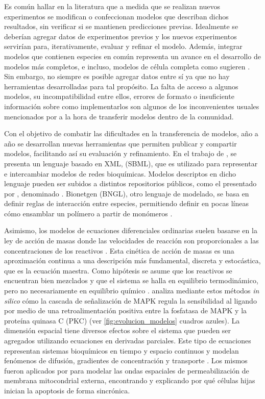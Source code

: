 Es común hallar en la literatura que a medida que se realizan nuevos experimentos se modifican o confeccionan modelos que describan dichos resultados, sin verificar si se mantienen predicciones previas. Idealmente se deberían agregar datos de experimentos previos y los nuevos experimentos servirían para, iterativamente, evaluar y refinar el modelo. Además, integrar modelos que contienen especies en común representa un avance en el desarrollo de modelos más completos, e incluso, modelos de célula completa como sugieren \cite{Karr2015}. Sin embargo, no siempre es posible agregar datos entre sí ya que no hay herramientas desarrolladas para tal propósito. La falta de acceso a algunos modelos, su incompatibilidad entre ellos, errores de formato o insuficiente información sobre como implementarlos son algunos de los inconvenientes usuales mencionados por \cite{Szigeti2018} a la hora de transferir modelos dentro de la comunidad.

Con el objetivo de combatir las dificultades en la transferencia de modelos, año a año se desarrollan nuevas herramientas que permiten publicar y compartir modelos, facilitando así su evaluación y refinamiento. En el trabajo de \cite{Hucka2003}, se presenta un lenguaje basado en XML,  (SBML), que es utilizado para representar e intercambiar modelos de redes bioquímicas. Modelos descriptos en dicho lenguaje pueden ser subidos a distintos repositorios públicos, como el presentado por \cite{Malik-Sheriff2018}, denominado . Bionetgen (BNGL), otro lenguaje de modelado, se basa en definir reglas de interacción entre especies, permitiendo definir en pocas líneas cómo ensamblar un polímero a partir de monómeros \citep{Harris2016}.

Asimismo, los modelos de ecuaciones diferenciales ordinarias suelen basarse en la ley de acción de masas donde las velocidades de reacción son proporcionales a las concentraciones de los reactivos \citep{Sorger2011}. Esta cinética de acción de masas es una aproximación continua a una descripción más fundamental, discreta y estocástica, que es la ecuación maestra. Como hipótesis se asume que los reactivos se encuentran bien mezclados y que el sistema se halla en equilibrio termodinámico, pero no necesariamente en equilibrio químico \citep{Chen2010}. \cite{Bhalla2002} analiza mediante estos métodos \textit{in silico} cómo la cascada de señalización de MAPK regula la sensibilidad al ligando por medio de una retroalimentación positiva entre la fosfatasa de MAPK y la proteína quinasa C (PKC) (ver \cref{fig:evolucion_modelos} cuadros azules). La dimensión espacial tiene diversos efectos sobre el sistema que pueden ser agregados utilizando ecuaciones en derivadas parciales. Este tipo de ecuaciones representan sistemas bioquímicos en tiempo y espacio continuos y modelan fenómenos de difusión, gradientes de concentración y transporte \citep{Sorger2011}. Los mismos fueron aplicados por \cite{Rehm2009} para modelar las ondas espaciales de permeabilización de membrana mitocondrial externa, encontrando y explicando por qué células hijas inician la apoptosis de forma sincrónica.

